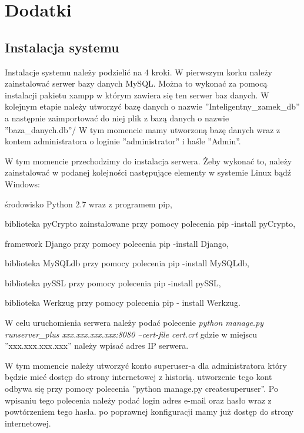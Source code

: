 \newpage
\section*{Dodatki} \label{Dodatki}
\subsection*{Instalacja systemu \NazwaSys}
Instalacje systemu należy podzielić na 4 kroki.
W pierwszym korku należy zainstalować serwer bazy danych MySQL. Można to wykonać za pomocą instalacji pakietu xampp w którym zawiera się ten serwer baz danych. W kolejnym etapie należy utworzyć bazę danych o nazwie ''Inteligentny\_zamek\_db'' a następnie zaimportować do niej plik z bazą danych o nazwie ''baza\_danych.db''/ W tym momencie mamy utworzoną bazę danych wraz z kontem administratora o loginie ''administrator'' i haśle ''Admin''.  

 W tym momencie przechodzimy do instalacja serwera. Żeby wykonać to, należy zainstalować w podanej kolejności następujące elementy w systemie Linux bądź Windows:
\begin{itemize*}
	\item środowisko Python 2.7 wraz z programem pip,
	\item biblioteka pyCrypto zainstalowane przy pomocy polecenia pip -install pyCrypto,
	\item  framework Django przy pomocy polecenia pip -install Django,
	\item biblioteka MySQLdb przy pomocy polecenia pip -install MySQLdb,
	\item  biblioteka pySSL przy pomocy polecenia pip -install pySSL,
	\item biblioteka Werkzug przy pomocy polecenia pip - install Werkzug.
\end{itemize*}



W celu uruchomienia serwera należy podać polecenie \textit{python manage.py runserver\_plus xxx.xxx.xxx.xxx:8080 --cert-file cert.crt} gdzie w miejscu ''xxx.xxx.xxx.xxx'' należy wpisać adres IP serwera.

W tym momencie należy utworzyć konto superuser-a dla administratora który będzie mieć dostęp do strony internetowej z historią. utworzenie tego kont odbywa się przy pomocy polecenia ''python manage.py createsuperuser''. Po wpisaniu tego polecenia należy podać login adres e-mail oraz hasło wraz z powtórzeniem tego hasła. po poprawnej konfiguracji mamy już dostęp do strony internetowej.

